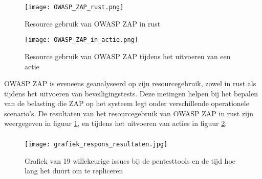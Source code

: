 \begin{figure}
    \centering
    \texttt{[image: OWASP\_ZAP\_rust.png]}
    \caption[Resource gebruik van OWASP ZAP in rust]{Resource gebruik van OWASP ZAP in rust}
    \label{fig:owasp_rust}
\end{figure}
\begin{figure}
    \centering
    \texttt{[image: OWASP\_ZAP\_in\_actie.png]}
    \caption[Resource gebruik van OWASP ZAP tijdens het uitvoeren van een actie]{Resource gebruik van OWASP ZAP tijdens het uitvoeren van een actie}
    \label{fig:owasp_actie}
\end{figure}
OWASP ZAP is eveneens geanalyseerd op zijn resourcegebruik, zowel in rust als tijdens het uitvoeren van beveiligingstests. 
Deze metingen helpen bij het bepalen van de belasting die ZAP op het systeem legt onder verschillende operationele scenario's. 
De resultaten van het resourcegebruik van OWASP ZAP in rust zijn weergegeven in figuur \ref{fig:owasp_rust}, en tijdens het 
uitvoeren van acties in figuur \ref{fig:owasp_actie}.

\subsubsection{}
\begin{figure}
    \centering
    \texttt{[image: grafiek\_respons\_resultaten.jpg]}
    \caption[Grafiek van 19 willekeurige issues bij de pentesttools en de tijd hoe lang het duurt om te repliceren]{Grafiek van 19 willekeurige issues bij de pentesttools en de tijd hoe lang het duurt om te repliceren}
    \label{fig:respons_grafiek}
\end{figure}

\subsection{}

\section{}
\subsection{}
